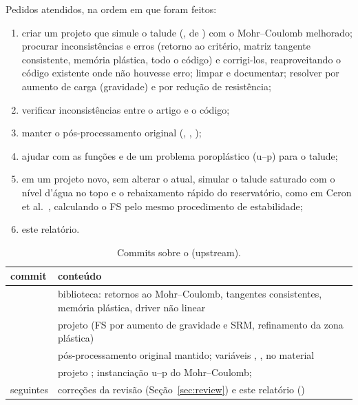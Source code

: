 \documentclass[11pt,a4paper]{article}
\newcommand{\cc}[1]{\texttt{\detokenize{#1}}} %
\begin{document}
Pedidos atendidos, na ordem em que foram feitos:
\begin{enumerate}
\item criar um projeto que simule o talude (,  de
  ) com o Mohr--Coulomb melhorado; procurar inconsistências e erros
  (retorno ao critério, matriz tangente consistente, memória plástica, todo o código) e corrigi-los,
  reaproveitando o código existente onde não houvesse erro; limpar e documentar; resolver por
  aumento de carga (gravidade) e por redução de resistência;
\item verificar inconsistências entre o artigo e o código;
\item manter o pós-processamento original (, ,
  );
\item ajudar com as funções  e  de um problema
  poroplástico (u--p) para o talude;
\item em um projeto novo, sem alterar o atual, simular o talude saturado com o nível d'água no
  topo e o rebaixamento rápido do reservatório, como em Ceron et al.\ \cite{ceron2025}, calculando o
  FS pelo mesmo procedimento de estabilidade;
\item este relatório.
\end{enumerate}

\begin{table}[h]
\centering\small
\begin{tabular}{@{}lL{11.5cm}@{}}
\toprule
commit & conteúdo \\
\midrule
{} & biblioteca: retornos ao Mohr--Coulomb, tangentes consistentes, memória plástica, driver não linear \\
 & projeto  (FS por aumento de gravidade e SRM, refinamento da zona plástica) \\
 & pós-processamento original mantido; variáveis , ,  no material \\
 & projeto ; instanciação u--p do Mohr--Coulomb;  \\
seguintes & correções da revisão (Seção~\ref{sec:review}) e este relatório () \\
\bottomrule
\end{tabular}
\caption{Commits sobre o \cc{e3eb3a4} (upstream).}
\end{table}
\end{document}
